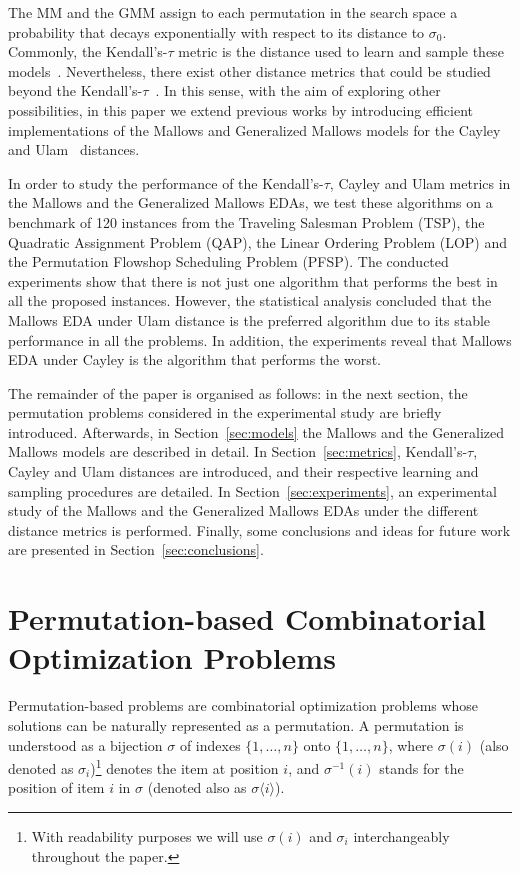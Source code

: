 \documentclass[conference]{IEEEtran}
\begin{document}
The MM and the GMM assign to each permutation in the search space a probability that decays exponentially with respect to its distance to $\sigma_0$. Commonly,  the Kendall's-$\tau$ metric is the distance used to learn and sample these models~\cite{ceberio11c,ceberio13a}. Nevertheless, there exist other distance metrics that could be studied beyond the Kendall's-$\tau$~\cite{Critchlow1991294}. In this sense, with the aim of exploring other possibilities, in this paper we extend previous works by introducing efficient implementations of the Mallows and Generalized Mallows models for the Cayley~\cite{irurozki2013a} and Ulam~\cite{irurozki2013b} distances. 

In order to study the performance of the Kendall's-$\tau$, Cayley and Ulam metrics in the Mallows and the Generalized Mallows EDAs, we test these algorithms on a benchmark of 120 instances from the Traveling Salesman Problem (TSP), the Quadratic Assignment Problem (QAP), the Linear Ordering Problem (LOP) and the Permutation Flowshop Scheduling Problem (PFSP). The conducted experiments show that there is not just one algorithm that performs the best in all the proposed instances. However, the statistical analysis concluded that the Mallows EDA under Ulam distance is the preferred algorithm due to its stable performance in all the problems. In addition, the experiments reveal that Mallows EDA under Cayley is the algorithm that performs the worst.

The remainder of the paper is organised as follows: in the next section, the permutation problems considered in the experimental study are briefly introduced. Afterwards, in Section~\ref{sec:models} the Mallows and the Generalized Mallows models are described in detail. In Section~\ref{sec:metrics}, Kendall's-$\tau$, Cayley and Ulam distances are introduced, and their respective learning and sampling procedures are detailed. In Section~\ref{sec:experiments}, an experimental study of the Mallows and the Generalized Mallows EDAs under the different distance metrics is performed. Finally, some conclusions and ideas for future work are presented in Section~\ref{sec:conclusions}.

\section{Permutation-based Combinatorial Optimization Problems}\label{sec:problems}

Permutation-based problems are combinatorial optimization problems whose solutions can be naturally represented as a permutation. A permutation is understood as a bijection  $\sigma$ of indexes $\{1,\ldots,n\}$ onto $\{1,\ldots,n\}$, where $\sigma(i)$ (also denoted as $\sigma_i$)\footnote{With readability purposes we will use $\sigma(i)$ and $\sigma_i$ interchangeably throughout the paper.} denotes the item at position $i$, and $\sigma^{-1}(i)$ stands for the position of item $i$ in $\sigma$ (denoted also as $\sigma\langle i \rangle$).
\end{document}

